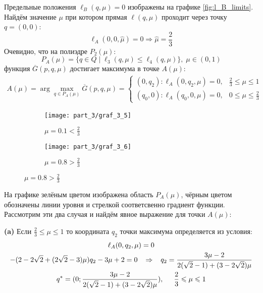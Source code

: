Предельные положения $\ell_B(q, \mu)=0$ изображены на графике 
\eqref{fig:l_B_limits}. Найдём значение $\mu$ при котором прямая 
$\ell(q, \mu)$ проходит через точку $q=(0,0)$:
$$
	\ell_A(0,0,\hat \mu) = 0 \Rightarrow \hat \mu = \frac{2}{3}
$$
Очевидно, что на полиэдре $P_2(\mu):$
$$
	P_A(\mu)=\{q \in Q \; | 
	\;  \ell_3(q, \mu) \leqslant \ell_4(q, \mu) \}, \; \mu \in (0,1)
$$
функция $\overline{G}(p,q,\mu)$ достигает максимума в точке $A(\mu):$
\begin{gather*}
	A(\mu)= \arg \max \limits_{q\in P_A(\mu)} \overline G(p,q,\mu) =
	\begin{cases}
		(0, q_2) : \ell_A(0,q_2,\mu) = 
		0, & \frac{2}{3} \leqslant \mu \leqslant 1 		
		\\
		(q_0, 0) : \ell_A(q_0,0,\mu) = 
		0, & 0 \leqslant \mu \leqslant \frac{2}{3}
	\end{cases}		
\end{gather*}
\begin{figure}[H]
   	\centering
	\begin{subfigure}[b]{0.45 \textwidth}
    	\centering
		\texttt{[image: part\_3/graf\_3\_5]}
        \caption{$\mu=0.1 < \frac{2}{3}$}
         \label{fig:y equals x}
     \end{subfigure}
     \hspace{10mm}
     \begin{subfigure}[b]{0.45 \textwidth}
     	\centering
        \texttt{[image: part\_3/graf\_3\_6]}
        \caption{$\mu=0.8 > \frac{2}{3}$}
        \label{fig:three sin x}
     \end{subfigure}
\end{figure}	
	
На графике зелёным цветом изображена область $P_A(\mu)$, чёрным цветом
обозначены линии уровня и стрелкой соответсвенно градиент функции.
Рассмотрим эти два случая и найдём явное выражение для точки $A(\mu)$:

\textbf{(a)}
Если $\frac{2}{3} \leqslant \mu \leqslant 1$ то координата $q_2$ 
точки максимума определяется из условия: 	
\begin{gather*}	
	\ell_A(0,q_2,\mu)=0 
	\\
	-(2-2\sqrt{2}+(2\sqrt{2}-3)\mu)q_2
	-3\mu+2=0
	\hspace{3mm} \Rightarrow \hspace{3mm}
	q_2=\frac{3\mu-2}{2(\sqrt{2}-1)+(3-2\sqrt{2})\mu}	
	\\
	q^*= (0;\dfrac{3\mu-2}{2(\sqrt{2}-1)+(3-2\sqrt{2})\mu}), 
	\hspace{5mm} \frac{2}{3} \leqslant \mu \leqslant 1
\end{gather*}

